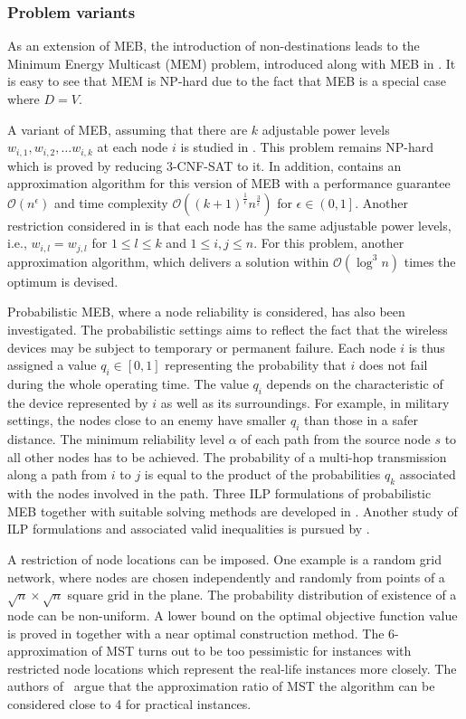 \subsubsection{Problem variants}

As an extension of MEB, the introduction of non-destinations leads to the Minimum Energy Multicast (MEM) problem, introduced along with MEB in \cite{wieselthier00}.
It is easy to see that MEM is NP-hard due to the fact that MEB is a special case where $D=V$. %

A variant of MEB, assuming that there are $k$ adjustable power levels $w_{i,1},w_{i,2},\dots w_{i,k}$ at each node $i$ is studied in \cite{liang02}.
This problem remains NP-hard which is proved by reducing \textsc{3-CNF-SAT} to it.
In addition, \cite{liang02} contains an approximation algorithm for this version of MEB with a performance guarantee $\mathcal{O}(n^\epsilon)$ and 
time complexity $\mathcal{O}((k+1)^{\frac{1}{\epsilon}} n^{\frac{3}{\epsilon}})$ for $\epsilon\in \left(0,1\right]$.
Another restriction considered in \cite{liang02} is that each node has the same adjustable power levels, i.e., $w_{i,l}=w_{j,l}$ for $1\leq l\leq k$ and $1\leq i,j\leq n$.
For this problem, another approximation algorithm, which delivers a solution within $\mathcal{O}(\log^3 n)$ times the optimum is devised.

Probabilistic MEB, where a node reliability is considered, has also been investigated.
The probabilistic settings aims to reflect the fact that the wireless devices may be subject to temporary or permanent failure.
Each node $i$ is thus assigned a value $q_i\in \left[0,1\right]$ representing the probability that $i$ does not fail during the whole operating time.
The value $q_i$ depends on the characteristic of the device represented by $i$ as well as its surroundings. 
For example, in military settings, the nodes close to an enemy have smaller $q_i$ than those in a safer distance.
The minimum reliability level $\alpha$ of each path from the source node $s$ to all other nodes has to be achieved.
The probability of a multi-hop transmission along a path from $i$ to $j$ is equal to the product of the probabilities $q_k$ associated with the nodes involved in the path.
Three ILP formulations of probabilistic MEB together with suitable solving methods are developed in \cite{montemanni08}.
Another study of ILP formulations and associated valid inequalities is pursued by \cite{barta10}.

A restriction of node locations can be imposed.
One example is a random grid network, where nodes are chosen independently and randomly from points of a $\sqrt{n}\times\sqrt{n}$ square grid in the plane.
The probability distribution of existence of a node can be non-uniform.
A lower bound on the optimal objective function value is proved in \cite{calamoneri08} together with a near optimal construction method.
The 6-approximation of MST turns out to be too pessimistic for instances with restricted node locations which represent the real-life instances more closely.
The authors of~\cite{flammini07} argue that the approximation ratio of MST the algorithm can be considered close to 4 for practical instances.

